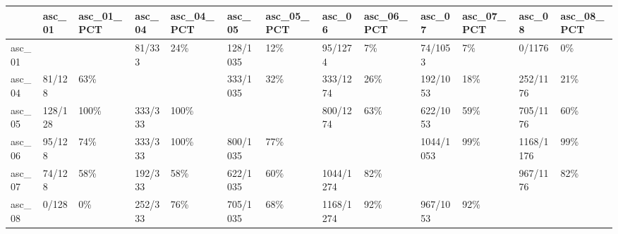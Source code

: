 \begin{tabular}{lllllllllllll}
\toprule
{} &   asc\_01 & asc\_01\_PCT &   asc\_04 & asc\_04\_PCT &    asc\_05 & asc\_05\_PCT &     asc\_06 & asc\_06\_PCT &     asc\_07 & asc\_07\_PCT &     asc\_08 & asc\_08\_PCT \\
\midrule
asc\_01 &          &            &   81/333 &        24\% &  128/1035 &        12\% &    95/1274 &         7\% &    74/1053 &         7\% &     0/1176 &         0\% \\
asc\_04 &   81/128 &        63\% &          &            &  333/1035 &        32\% &   333/1274 &        26\% &   192/1053 &        18\% &   252/1176 &        21\% \\
asc\_05 &  128/128 &       100\% &  333/333 &       100\% &           &            &   800/1274 &        63\% &   622/1053 &        59\% &   705/1176 &        60\% \\
asc\_06 &   95/128 &        74\% &  333/333 &       100\% &  800/1035 &        77\% &            &            &  1044/1053 &        99\% &  1168/1176 &        99\% \\
asc\_07 &   74/128 &        58\% &  192/333 &        58\% &  622/1035 &        60\% &  1044/1274 &        82\% &            &            &   967/1176 &        82\% \\
asc\_08 &    0/128 &         0\% &  252/333 &        76\% &  705/1035 &        68\% &  1168/1274 &        92\% &   967/1053 &        92\% &            &            \\
\bottomrule
\end{tabular}
